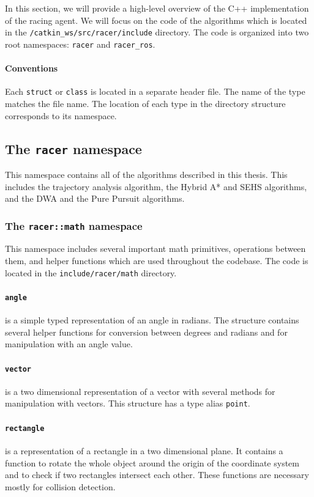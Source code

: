 In this section, we will provide a high-level overview of the C++ implementation of the racing agent. We will focus on the code of the algorithms which is located in the \texttt{/catkin\_ws/src/racer/include} directory. The code is organized into two root namespaces: \texttt{racer} and \texttt{racer\_ros}.

\paragraph{Conventions} Each \texttt{struct} or \texttt{class} is located in a separate header file. The name of the type matches the file name. The location of each type in the directory structure corresponds to its namespace.

\subsection{The \texttt{racer} namespace}

This namespace contains all of the algorithms described in this thesis. This includes the trajectory analysis algorithm, the Hybrid A* and \gls*{SEHS} algorithms, and the \gls*{DWA} and the Pure Pursuit algorithms.

\subsubsection{The \texttt{racer::math} namespace}

This namespace includes several important math primitives, operations between them, and helper functions which are used throughout the codebase. The code is located in the \texttt{include/racer/math} directory.

\paragraph{\texttt{angle}} is a simple typed representation of an angle in radians. The structure contains several helper functions for conversion between degrees and radians and for manipulation with an angle value.

\paragraph{\texttt{vector}} is a two dimensional representation of a vector with several methods for manipulation with vectors. This structure has a type alias \texttt{point}.

\paragraph{\texttt{rectangle}} is a representation of a rectangle in a two dimensional plane. It contains a function to rotate the whole object around the origin of the coordinate system and to check if two rectangles intersect each other. These functions are necessary mostly for collision detection.

